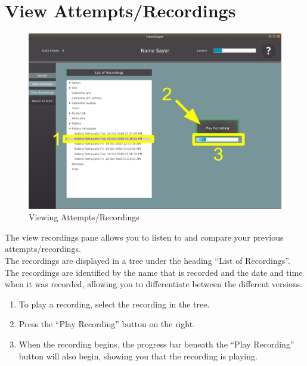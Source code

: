 \documentclass[a4paper,12pt]{article}
\begin{document}
\section{View Attempts/Recordings}
\begin{figure}[!h]
	\includegraphics[width=\linewidth]{viewrec.png}
	\caption{Viewing Attempts/Recordings}
\end{figure}
The view recordings pane allows you to listen to and compare your previous attempts/recordings.
\\


The recordings are displayed in a tree under the heading “List of Recordings”.
\\


The recordings are identified by the name that is recorded and the date and time when it was recorded, allowing you to differentiate between the different versions.

\begin{enumerate}[label=\textbf{\arabic*}]
	\item To play a recording, select the recording in the tree.
	
	\item Press the “Play Recording” button on the right.
	
	\item When the recording begins, the progress bar beneath the “Play Recording” button will also begin, showing you that the recording is playing.
\end{enumerate}
\newpage
\end{document}
